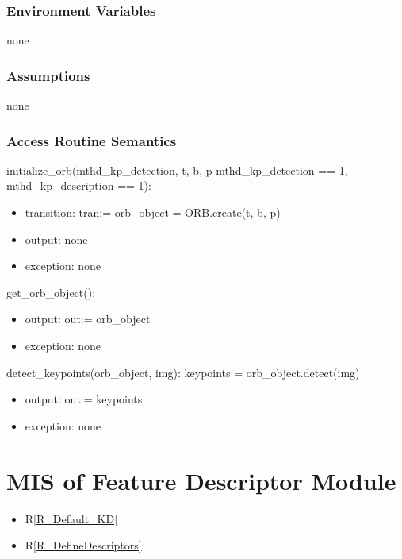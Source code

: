 \documentclass[12pt, titlepage]{article}
\begin{document}
\subsubsection{Environment Variables}
none

\subsubsection{Assumptions}
none
\subsubsection{Access Routine Semantics}

\noindent initialize\_orb(mthd\_kp\_detection, t, b, p 
\textbar \: mthd\_kp\_detection == 1, mthd\_kp\_description == 1):
\begin{itemize}
  \item transition: tran:= orb\_object = ORB.create(t, b, p) 
  \item output: none
  \item exception: none
\end{itemize}
\noindent get\_orb\_object():
\begin{itemize}
  \item output: out:= orb\_object
  \item exception: none
\end{itemize}
\noindent detect\_keypoints(orb\_object, img):\newline\newline
keypoints = orb\_object.detect(img)
\begin{itemize}
  \item output: out:= keypoints
  \item exception: none
\end{itemize}



\section{MIS of Feature Descriptor Module} \label{mFD}
\begin{itemize}
  \item R\ref{R_Default_KD}
  \item R\ref{R_DefineDescriptors}
\end{itemize}
\end{document}
